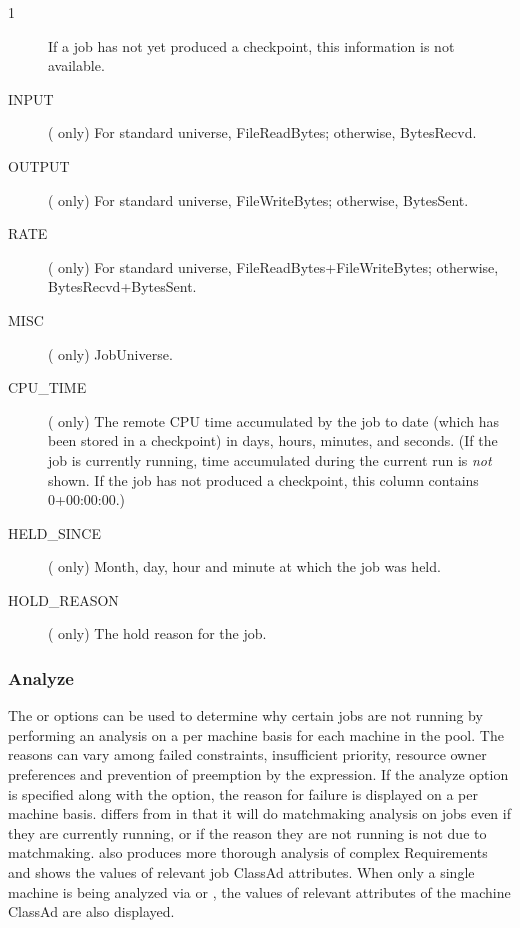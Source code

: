 \begin{ManPage}{\label{man-condor-q}}{1}
\begin{description}
    If a job has not yet produced a checkpoint, this information is not
    available.
\item[INPUT] ( only) For standard universe, FileReadBytes;
    otherwise, BytesRecvd.
\item[OUTPUT] ( only) For standard universe, FileWriteBytes;
    otherwise, BytesSent.
\item[RATE] ( only) For standard universe,
    FileReadBytes+FileWriteBytes; otherwise, BytesRecvd+BytesSent.
\item[MISC] ( only) JobUniverse.
\item[CPU\_TIME] ( only) The remote CPU time accumulated by
  the job to date
  (which has been stored in a checkpoint) in days, hours, minutes, and
  seconds.  (If the job is currently running, time accumulated during
  the current run is \emph{not} shown.  If the job has not produced a
  checkpoint, this column contains 0+00:00:00.)
\item[HELD\_SINCE] ( only) Month, day, hour and minute
  at which the job was held.
\item[HOLD\_REASON] ( only) The hold reason for the job.
\end{description}

\subsubsection*{Analyze}
The  or  options can be used to determine 
why certain jobs are not
running by performing an analysis on a per machine basis for each machine in 
the pool.  The reasons can vary among failed constraints, insufficient priority,
resource owner preferences and prevention of preemption by the 
 expression.  
If the analyze option  is specified 
along with the  option, the reason for failure is displayed on a 
per machine basis. 
 differs from  in that it will
do matchmaking analysis on jobs even if they are currently running, 
or if the reason they are not running is not due to matchmaking.
 also produces
more thorough analysis of complex Requirements and shows the values of 
relevant job ClassAd attributes.  
When only a single machine is being analyzed via  or
,
the values of relevant attributes of the machine ClassAd are also displayed.


\end{ManPage}
